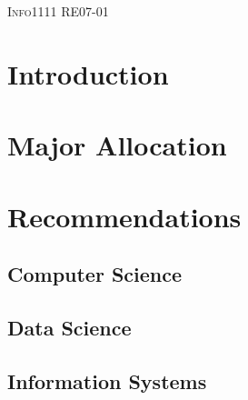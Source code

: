 \documentclass[12pt, a4paper]{article}
\begin{document}
	\begin{titlepage}
		\begin{center}

			\begin{center}
				\begin{large}
					\begin{tabular}{cc}

					\end{tabular}
				\end{large}
			\end{center}
			
			\textsc{\large Info1111 RE07-01}

			
		\end{center}
	\end{titlepage}
		
	\clearpage

	\tableofcontents

	\clearpage
	\setcounter{page}{1}
	

	\section{Introduction}

	\clearpage
	
	\section{Major Allocation}

	\clearpage
	
	\section{Recommendations}
	\subsection{Computer Science}

	\clearpage
	
	\subsection{Data Science}

	\clearpage
	
	\subsection{Information Systems}

	\clearpage
	
\end{document}
